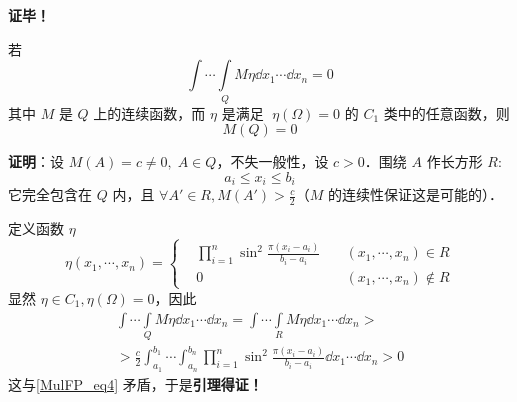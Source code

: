\textbf{证毕！}

\begin{lemma}{}
若
\begin{equation}\label{MulFP_eq4}
\int\cdots\int\limits_Q M\eta\dd x_1\cdots\dd x_n=0
\end{equation}
其中 $M$ 是 $Q$ 上的连续函数，而 $\eta$ 是满足 $\;\eta(\Omega)=0$  的 $C_1$ 类中的任意函数，则
\begin{equation}
M(Q)=0
\end{equation}
\end{lemma}
  \textbf{证明}：设 $M(A)=c\neq0,\;A\in Q$，不失一般性，设 $c>0$．围绕 $A$ 作长方形 $R$:
  \begin{equation}
  a_i\leq x_i\leq b_i
  \end{equation}
  它完全包含在 $Q$ 内，且 $\forall A'\in R,M(A')>\frac{c}{2}$（$M$ 的连续性保证这是可能的）．

  定义函数 $\eta$
  \begin{equation}
  \eta(x_1,\cdots,x_n)=\left\{
      \begin{aligned}
      &\prod_{i=1}^n \sin^2\frac{\pi(x_i-a_i)}{b_i-a_i}\quad &(x_1,\cdots,x_n)\in R\\
      &0\quad &(x_1,\cdots,x_n)\notin R
      \end{aligned}\right.
  \end{equation}
  显然 $\eta\in C_1,\eta(\Omega)=0$，因此
  \begin{equation}
  \begin{aligned}
  \int\cdots\int\limits_Q M\eta\dd x_1\cdots\dd x_n=\int\cdots\int\limits_R M\eta\dd x_1\cdots\dd x_n>\\
  >\frac{c}{2}\int_{a_1}^{b_1}\cdots\int_{a_n}^{b_n}\prod_{i=1}^n \sin^2\frac{\pi(x_i-a_i)}{b_i-a_i}\dd x_1\cdots\dd x_n>0
  \end{aligned}
  \end{equation}
  这与\autoref{MulFP_eq4} 矛盾，于是\textbf{引理得证！}